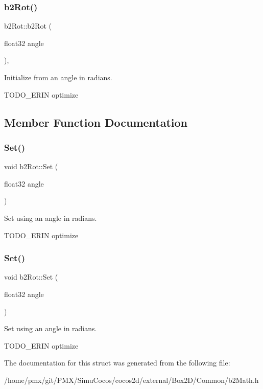\subsubsection{\texorpdfstring{b2\+Rot()}{b2Rot()}\hspace{0.1cm}{\footnotesize\ttfamily [2/2]}}
{\footnotesize\ttfamily b2\+Rot\+::b2\+Rot (\begin{DoxyParamCaption}\item[{float32}]{angle }\end{DoxyParamCaption})\hspace{0.3cm}{\ttfamily [inline]}, {\ttfamily [explicit]}}



Initialize from an angle in radians. 

T\+O\+D\+O\+\_\+\+E\+R\+IN optimize 

\subsection{Member Function Documentation}
\mbox{\label{structb2Rot_acde9186de0a4a7397bf8ef714408ad60}} 
\subsubsection{\texorpdfstring{Set()}{Set()}\hspace{0.1cm}{\footnotesize\ttfamily [1/2]}}
{\footnotesize\ttfamily void b2\+Rot\+::\+Set (\begin{DoxyParamCaption}\item[{float32}]{angle }\end{DoxyParamCaption})\hspace{0.3cm}{\ttfamily [inline]}}



Set using an angle in radians. 

T\+O\+D\+O\+\_\+\+E\+R\+IN optimize \mbox{\label{structb2Rot_acde9186de0a4a7397bf8ef714408ad60}} 
\subsubsection{\texorpdfstring{Set()}{Set()}\hspace{0.1cm}{\footnotesize\ttfamily [2/2]}}
{\footnotesize\ttfamily void b2\+Rot\+::\+Set (\begin{DoxyParamCaption}\item[{float32}]{angle }\end{DoxyParamCaption})\hspace{0.3cm}{\ttfamily [inline]}}



Set using an angle in radians. 

T\+O\+D\+O\+\_\+\+E\+R\+IN optimize 

The documentation for this struct was generated from the following file\+:\begin{DoxyCompactItemize}
\item 
/home/pmx/git/\+P\+M\+X/\+Simu\+Cocos/cocos2d/external/\+Box2\+D/\+Common/b2\+Math.\+h\end{DoxyCompactItemize}
